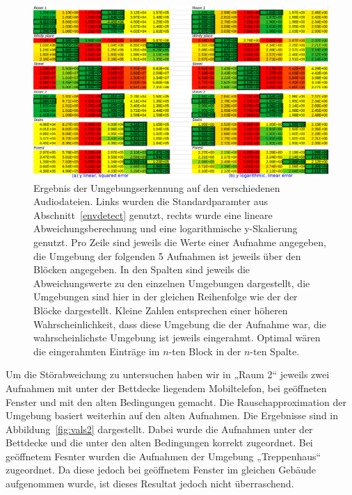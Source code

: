 \documentclass[
	fontsize=10.5pt,
	marginpar=false,
	ngerman,
	accentcolor=3d
	]{tudapub}
\begin{document}
\begin{figure}[ht]
	\centering
	\includegraphics[width=1.0\textwidth]{media/vals2}
	\caption{Ergebnis der Umgebungserkennung auf den verschiedenen Audiodateien. Links wurden die Standardparamter aus Abschnitt~\ref{envdetect} genutzt, rechts wurde eine lineare Abweichungsberechnung und eine logarithmische y-Skalierung genutzt. Pro Zeile sind jeweils die Werte einer Aufnahme angegeben, die Umgebung der folgenden 5 Aufnahmen ist jeweils über den Blöcken angegeben. In den Spalten sind jeweils die Abweichungswerte zu den einzelnen Umgebungen dargestellt, die Umgebungen sind hier in der gleichen Reihenfolge wie der der Blöcke dargestellt. Kleine Zahlen entsprechen einer höheren Wahrscheinlichkeit, dass diese Umgebung die der Aufnahme war, die wahrscheinlichste Umgebung ist jeweils eingerahmt. Optimal wären die eingerahmten Einträge im $n$-ten Block in der $n$-ten Spalte.}
	\label{fig:vals1}
\end{figure}

Um die Störabweichung zu untersuchen haben wir in „Raum 2“ jeweils zwei Aufnahmen mit unter der Bettdecke liegendem Mobiltelefon, bei geöffneten Fenster und mit den alten Bedingungen gemacht. Die Rauschapproximation der Umgebung basiert weiterhin auf den alten Aufnahmen. Die Ergebnisse sind in Abbildung~\ref{fig:vals2} dargestellt. Dabei wurde die Aufnahmen unter der Bettdecke und die unter den alten Bedingungen korrekt zugeordnet. Bei geöffnetem Fesnter wurden die Aufnahmen der Umgebung „Treppenhaus“ zugeordnet. Da diese jedoch bei geöffnetem Fenster im gleichen Gebäude aufgenommen wurde, ist dieses Resultat jedoch nicht überraschend.
\end{document}
